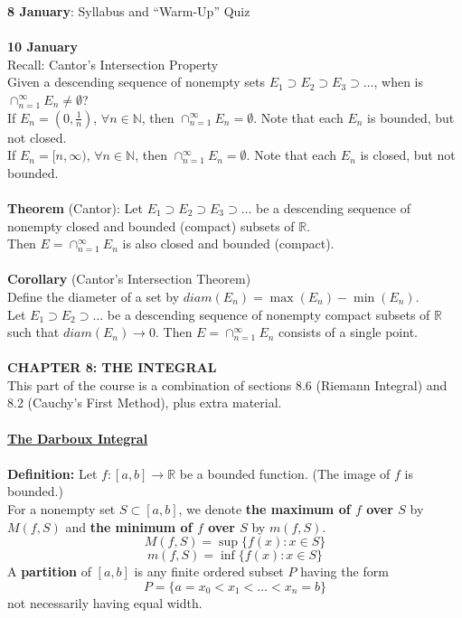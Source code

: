 \documentclass[12pt]{article}
\begin{document}
{\bf 8 January}: Syllabus and ``Warm-Up'' Quiz\\
\\
{\bf 10 January}\\
Recall: Cantor's Intersection Property\\
Given a descending sequence of nonempty sets $E_1\supset E_2\supset E_3\supset\ldots$, when is $\cap_{n=1}^\infty E_n\neq\emptyset$?\\
If $E_n=(0,\frac1n)$, $\forall n\in\mathbb{N}$, then $\cap_{n=1}^\infty E_n=\emptyset$. Note that each $E_n$ is bounded, but not closed.\\
If $E_n=[n,\infty)$, $\forall n\in\mathbb{N}$, then $\cap_{n=1}^\infty E_n=\emptyset$. Note that each $E_n$ is closed, but not bounded.\\
\\
{\bf Theorem} (Cantor): Let $E_1\supset E_2\supset E_3\supset\ldots$ be a descending sequence of nonempty closed and bounded (compact) subsets of $\mathbb{R}$.\\
Then $E=\cap_{n=1}^\infty E_n$ is also closed and bounded (compact).\\
\\
{\bf Corollary} (Cantor's Intersection Theorem)\\
Define the diameter of a set by $diam(E_n)=\max(E_n)-\min(E_n)$.\\
Let $E_1\supset E_2\supset\ldots$ be a descending sequence of nonempty compact subsets of $\mathbb{R}$ such that $diam(E_n)\rightarrow0$. Then $E=\cap_{n=1}^\infty E_n$ consists of a single point.\\
\\
{\bf CHAPTER 8: THE INTEGRAL}\\
This part of the course is a combination of sections 8.6 (Riemann Integral) and 8.2 (Cauchy's First Method), plus extra material.\\
\\
\underline{\bf The Darboux Integral}\\
\\
{\bf Definition:} Let $f:[a,b]\rightarrow\mathbb{R}$ be a bounded function. (The image of $f$ is bounded.)\\
For a nonempty set $S\subset[a,b]$, we denote {\bf the maximum of $f$ over $S$} by $M(f,S)$ and {\bf the minimum of $f$ over $S$} by $m(f,S)$.\\
$$M(f,S)=\sup\{f(x):x\in S\}$$
$$m(f,S)=\inf\{f(x):x\in S\}$$
A {\bf partition} of $[a,b]$ is any finite ordered subset $P$ having the form
$$P=\{a=x_0<x_1<\ldots<x_n=b\}$$
not necessarily having equal width.\\
\end{document}
